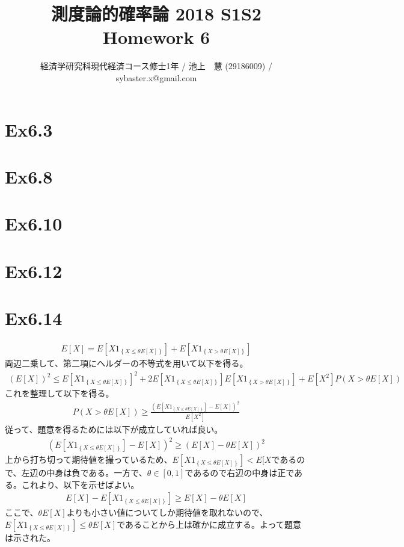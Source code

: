 \documentclass{article}
\begin{document}
\title{測度論的確率論 2018 S1S2 \\ 
Homework 6}
\author{経済学研究科現代経済コース修士1年 / 池上　慧 (29186009) / sybaster.x@gmail.com}
\maketitle

\section{Ex6.3}


\section{Ex6.8}

\section{Ex6.10}

\section{Ex6.12}

\section{Ex6.14}
\begin{align*}
	E[X] = E\left[ X 1_{\left\{ X \leq \theta E[X] \right\}} \right] + E\left[ X 1_{\left\{ X > \theta E[X] \right\}} \right]
\end{align*}
両辺二乗して、第二項にヘルダーの不等式を用いて以下を得る。
\begin{align*}
	\left( E[X] \right)^2 \leq E\left[ X 1_{\left\{ X \leq \theta E[X] \right\}} \right]^2 + 2 E\left[ X 1_{\left\{ X \leq \theta E[X] \right\}} \right] E\left[ X 1_{\left\{ X > \theta E[X] \right\}} \right] + E[X^2] P\left( X > \theta E[X] \right)
\end{align*}
これを整理して以下を得る。
\begin{align*}
	P\left( X > \theta E[X] \right) \geq \frac{\left( E\left[ X 1_{\left\{ X \leq \theta E[X] \right\}} \right] - E[X] \right)^2}{E[X^2]}
\end{align*}
従って、題意を得るためには以下が成立していれば良い。
\begin{align*}
	\left( E\left[ X 1_{\left\{ X \leq \theta E[X] \right\}} \right] - E[X] \right)^2 \geq \left( E[X] - \theta E[X] \right)^2
\end{align*}
上から打ち切って期待値を撮っているため、$E\left[ X 1_{\left\{ X \leq \theta E[X] \right\}} \right] < E[X$であるので、左辺の中身は負である。一方で、$\theta \in [0,1]$であるので右辺の中身は正である。これより、以下を示せばよい。
\begin{align*}
	E[X] - E\left[ X 1_{\left\{ X \leq \theta E[X] \right\}} \right]  \geq E[X] - \theta E[X] 
\end{align*}
ここで、$\theta E[X]$よりも小さい値についてしか期待値を取れないので、$E\left[ X 1_{\left\{ X \leq \theta E[X] \right\}} \right] \leq \theta E[X]$であることから上は確かに成立する。よって題意は示された。
\end{document}
